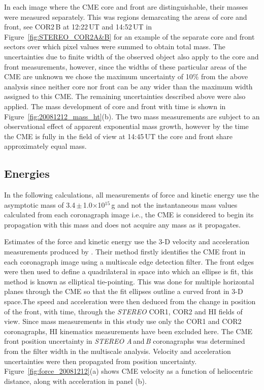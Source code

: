 In each image where the CME core and front are distinguishable, their masses were measured separately. This was regions demarcating the areas of core and front, see COR2\,B at 12:22\,UT and 14:52\,UT in Figure~\ref{fig:STEREO_COR2A&B} for an example of the separate core and front sectors over which pixel values were summed to obtain total mass. The uncertainties due to finite width of the observed object also apply to the core and front measurements, however, since the widths of these particular areas of the CME are unknown we chose the maximum uncertainty of 10\% from the above analysis since neither core nor front can be any wider than the maximum width assigned to this CME. The remaining uncertainties described above were also applied. The mass development of core and front with time is shown in Figure~\ref{fig:20081212_mass_ht}(b). The two mass measurements are subject to an observational effect of apparent exponential mass growth, however by the time the CME is fully in the field of view 
at 14:45\,UT the core and front share approximately equal mass. 


\subsection{Energies}\label{sec:2}

In the following calculations, all measurements of force and kinetic energy use the asymptotic mass of 3.4\,$\pm$\,1.0$\times$10$^{15}$\,g and not the instantaneous mass values calculated from each coronagraph image i.e., the CME is considered to begin its propagation with this mass and does not acquire any mass as it propagates. 

Estimates of the force and kinetic energy use the 3-D velocity and acceleration measurements produced by \citet{byr10}. Their method firstly identifies the CME front in each coronagraph image using a multiscale edge detection filter. The front edges were then used to define a quadrilateral in space into which an ellipse is fit, this method is known as elliptical tie-pointing. This was done for multiple horizontal planes through the CME so that the fit ellipses outline a curved front in 3-D space.The speed and acceleration were then deduced from the change in position of the front, with time, through the \emph{STEREO} COR1, COR2 and HI fields of view. Since mass measurements in this study use only the COR1 and COR2 coronagraphs, HI kinematics measurements have been excluded here. The CME front position uncertainty in \emph{STEREO A}\,and\,\emph{B} coronagraphs was determined from the filter width in the multiscale analysis. Velocity and acceleration uncertainties were then propagated from position uncertainty.  Figure~\ref{fig:force_20081212}(a) shows CME velocity as a function of heliocentric distance, along with acceleration in panel (b). 

